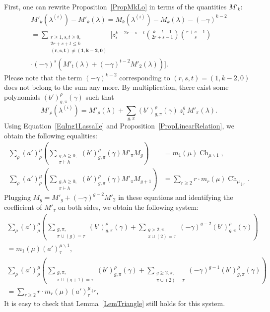 \documentclass[11pt]{amsart}
\theoremstyle{plain}
\theoremstyle{remark}
\newcommand{\lo}{\lambda^{(i)}}
\DeclareMathOperator{\Ch}{Ch}
\begin{document}
First, one can rewrite Proposition~\ref{PropMkLo} in terms of the quantities $M'_k$:
\begin{multline}
    M'_k(\lambda^{(i)}) - M'_k(\lambda)
    =M_k(\lambda^{(i)}) - M_k(\lambda) - (-\gamma)^{k-2} \\
    =    \sum_{\substack{ r\geq 1, s,t \geq 0, \\ 2r+s+t \leq k \\  \bm{(r,s,t) \neq (1,k-2,0) }}}
     \Bigg[ z_i^{k-2r-s-t}  \binom{k-t-1}{2r+s-1}\binom{r+s-1}{s} \\ 
    \cdot (-\gamma)^s (M'_t(\lambda)+ (-\gamma)^{t-2} M'_2(\lambda)) \Bigg].
    \label{EqM'klo}
\end{multline}
Please note that the term $(-\gamma)^{k-2}$ corresponding to $(r,s,t)=(1,k-2,0)$
does not belong to the sum any more.
By multiplication, there exist some polynomials $(b')_{g,\pi}^\rho(\gamma)$ such that
\[M'_\rho(\lo) = M'_\rho(\lambda) + \sum_{g,\pi} (b')_{g,\pi}^\rho(\gamma)\
z_i^g\ M'_\pi(\lambda).\]
Using Equation~\eqref{EqIng1Lassalle} and Proposition~\ref{PropLinearRelation}, we obtain
the following equalities:
\begin{align}
    \sum_\rho (a')^\mu_\rho \left( \sum_{\substack{g,h \geq 0, \\ \pi \vdash h}} (b')_{g,\pi}^\rho(\gamma) 
    M'_\pi M_g  \right) &= m_1(\mu) \Ch_{\mu \backslash 1},
    \tag{$A'$}\label{EqRec1'}\\
    \sum_\rho (a')^\mu_\rho \left( \sum_{\substack{g,h \geq 0, \\ \pi \vdash h}} (b')_{g,\pi}^\rho(\gamma) 
    M'_\pi M_{g+1}  \right) &= \sum_{r \geq 2} r \cdot m_r(\mu) \Ch_{\mu_{\downarrow r}}.
    \tag{$B'$}\label{EqRec2'}
\end{align}
Plugging $M_g=M'_g + (-\gamma)^{g-2} M'_2$ in these equations and identifying the coefficient
of $M'_\tau$ on both sides, we obtain the following system:
\begin{multline*}
    \sum_\rho (a')^\mu_\rho \left( \sum_{\substack{g, \pi, \\ \pi \cup (g)=\tau}} (b')_{g,\pi}^\rho(\gamma) 
    + \sum_{\substack{g>2, \pi, \\ \pi \cup (2)=\tau}} (-\gamma)^{g-2} (b')_{g,\pi}^\rho(\gamma)  \right) \\ =
    m_1(\mu) (a')^{\mu \backslash 1}_\tau,
    \tag{$A'_\tau$}\label{EqRec1'tau}
\end{multline*}
\begin{multline*}
    \sum_\rho (a')^\mu_\rho \left( \sum_{\substack{g, \pi, \\ \pi \cup (g+1)=\tau}} (b')_{g,\pi}^\rho(\gamma) 
    + \sum_{\substack{g \geq 2, \pi ,\\ \pi \cup (2)=\tau}} (-\gamma)^{g-1} (b')_{g,\pi}^\rho(\gamma)
    \right) \\= \sum_{r \geq 2} r \cdot m_r(\mu) (a')^{\mu_{\downarrow r}}_\tau,
    \tag{$B'_\tau$}\label{EqRec2'tau}
 \end{multline*}
It is easy to check that Lemma~\ref{LemTriangle} still holds for this system.
\end{document}
